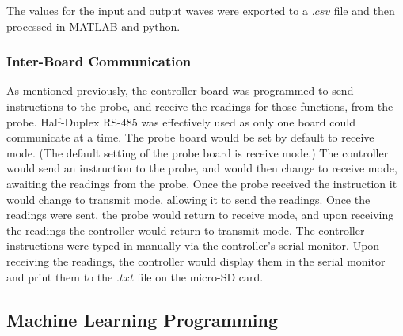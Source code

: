 The values for the input and output waves were exported to a $.csv$ file and then processed in MATLAB and python.

\subsubsection{Inter-Board Communication}
As mentioned previously, the controller board was programmed to send instructions to the probe, and receive the readings for those functions, from the probe.
Half-Duplex RS-485 was effectively used as only one board could communicate at a time.
The probe board would be set by default to receive mode. (The default setting of the probe board is receive mode.)
The controller would send an instruction to the probe, and would then change to receive mode, awaiting the readings from the probe.
Once the probe received the instruction it would change to transmit mode, allowing it to send the readings.
Once the readings were sent, the probe would return to receive mode, and upon receiving the readings the controller would return to transmit mode.
The controller instructions were typed in manually via the controller's serial monitor.
Upon receiving the readings, the controller would display them in the serial monitor and print them to the $.txt$ file on the micro-SD card.

\subsection{Machine Learning Programming}

